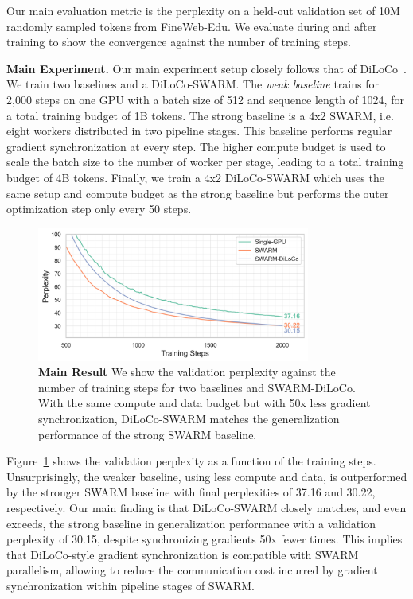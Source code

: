 \documentclass{article}
\begin{document}
Our main evaluation metric is the perplexity on a held-out validation set of 10M
randomly sampled tokens from FineWeb-Edu. We evaluate during and after training
to show the convergence against the number of training steps.

\textbf{Main Experiment.} Our main experiment setup closely follows that of
DiLoCo~\cite{douillard2023diloco}. We train two baselines and a DiLoCo-SWARM. The
\textit{weak baseline} trains for 2,000 steps on one GPU with a batch size of
512 and sequence length of 1024, for a total training budget of 1B tokens. The 
strong baseline is a 4x2 SWARM, i.e. eight workers distributed in two pipeline 
stages. This baseline performs regular gradient synchronization at every step.
The higher compute budget is used to scale the batch size to the number of
worker per stage, leading to a total training budget of 4B tokens. Finally, we
train a 4x2 DiLoCo-SWARM which uses the same setup and compute budget as the
strong baseline but performs the outer optimization step only every 50 steps.

\begin{figure}[t]
  \centering
  \includegraphics[width=0.8\textwidth]{figures/experiment1.png}
  \caption{\textbf{Main Result} We show the validation perplexity against the
  number of training steps for two baselines and SWARM-DiLoCo. With the same
  compute and data budget but with 50x less gradient synchronization,
  DiLoCo-SWARM matches the generalization performance of the strong SWARM
  baseline.}
  \label{fig:experiment1}
\end{figure}

Figure~\ref{fig:experiment1} shows the validation perplexity as a function of
the training steps. Unsurprisingly, the weaker baseline, using less compute and
data, is outperformed by the stronger SWARM baseline with final perplexities of 
37.16 and 30.22, respectively. Our main finding is that DiLoCo-SWARM closely
matches, and even exceeds, the strong baseline in generalization performance
with a validation perplexity of 30.15, despite synchronizing gradients 50x fewer
times. This implies that DiLoCo-style gradient synchronization is compatible
with SWARM parallelism, allowing to reduce the communication cost incurred by 
gradient synchronization within pipeline stages of SWARM.
\end{document}

